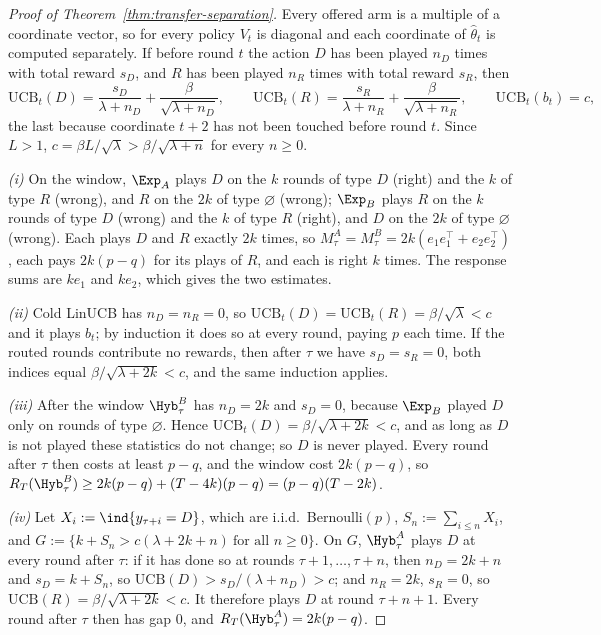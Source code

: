 
\begin{proof}[Proof of Theorem~\ref{thm:transfer-separation}]
Every offered arm is a multiple of a coordinate vector, so for every policy
$V_t$ is diagonal and each coordinate of $\widehat\theta_t$ is computed
separately. If before round $t$ the action $D$ has been played $n_D$ times with
total reward $s_D$, and $R$ has been played $n_R$ times with total reward
$s_R$, then
\[
\mathrm{UCB}_t(D)=\frac{s_D}{\lambda+n_D}+\frac{\beta}{\sqrt{\lambda+n_D}},\qquad
\mathrm{UCB}_t(R)=\frac{s_R}{\lambda+n_R}+\frac{\beta}{\sqrt{\lambda+n_R}},\qquad
\mathrm{UCB}_t(b_t)=c,
\]
the last because coordinate $t+2$ has not been touched before round $t$.
Since $L>1$, $c=\beta L/\sqrt\lambda>\beta/\sqrt{\lambda+n}$ for every
$n\ge0$.

\emph{(i)} On the window, $\Exp_A$ plays $D$ on the $k$ rounds of type $D$
(right) and the $k$ of type $R$ (wrong), and $R$ on the $2k$ of type
$\varnothing$ (wrong); $\Exp_B$ plays $R$ on the $k$ rounds of type $D$ (wrong)
and the $k$ of type $R$ (right), and $D$ on the $2k$ of type $\varnothing$
(wrong). Each plays $D$ and $R$ exactly $2k$ times, so
$M^A_\tau=M^B_\tau=2k(e_1e_1^\top+e_2e_2^\top)$, each pays $2k(p-q)$ for its
plays of $R$, and each is right $k$ times. The response sums are $ke_1$ and
$ke_2$, which gives the two estimates.

\emph{(ii)} Cold LinUCB has $n_D=n_R=0$, so $\mathrm{UCB}_t(D)=\mathrm{UCB}_t(R)
=\beta/\sqrt\lambda<c$ and it plays $b_t$; by induction it does so at every
round, paying $p$ each time. If the routed rounds contribute no rewards, then
after $\tau$ we have $s_D=s_R=0$, both indices equal $\beta/\sqrt{\lambda+2k}<c$,
and the same induction applies.

\emph{(iii)} After the window $\Hyb^B_\tau$ has $n_D=2k$ and $s_D=0$, because
$\Exp_B$ played $D$ only on rounds of type $\varnothing$. Hence
$\mathrm{UCB}_t(D)=\beta/\sqrt{\lambda+2k}<c$, and as long as $D$ is not
played these statistics do not change; so $D$ is never played. Every round
after $\tau$ then costs at least $p-q$, and the window cost $2k(p-q)$, so
$R_T(\Hyb^B_\tau)\ge2k(p-q)+(T-4k)(p-q)=(p-q)(T-2k)$.

\emph{(iv)} Let $X_i:=\ind\{y_{\tau+i}=D\}$, which are i.i.d.\ Bernoulli$(p)$,
$S_n:=\sum_{i\le n}X_i$, and
$G:=\{k+S_n>c(\lambda+2k+n)\ \text{for all }n\ge0\}$. On $G$, $\Hyb^A_\tau$
plays $D$ at every round after $\tau$: if it has done so at rounds
$\tau+1,\dots,\tau+n$, then $n_D=2k+n$ and $s_D=k+S_n$, so
$\mathrm{UCB}(D)>s_D/(\lambda+n_D)>c$; and $n_R=2k$, $s_R=0$, so
$\mathrm{UCB}(R)=\beta/\sqrt{\lambda+2k}<c$. It therefore plays $D$ at round
$\tau+n+1$. Every round after $\tau$ then has gap $0$, and
$R_T(\Hyb^A_\tau)=2k(p-q)$.


\end{proof}
